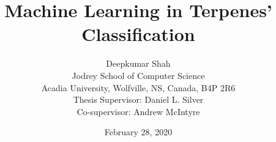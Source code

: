 \documentclass[12pt, a4paper]{article}
\title{Machine Learning in Terpenes' Classification}
\date{February 28, 2020}
\author{Deepkumar Shah \\Jodrey School of Computer Science \\Acadia University, Wolfville, NS, Canada, B4P 2R6 \\[1 cm]{\small Thesis Supervisor: Daniel L. Silver} \\{\small Co-supervisor: Andrew McIntyre}}
\newcommand\summaryname{Abstract}
\newenvironment{Abstract}%
    {\small\begin{center}%
    \bfseries{\summaryname} \end{center}}
\begin{document}
\maketitle

{}

\begin{Abstract}
Traditionally, separation and classification of terpenes from food samples is done with the help of two processes, namely: Gas Chromatography (GC) (separate terpenes from each other) and Mass Spectrometry (MS) (detects the separated terpenes) \cite{de2000} \cite{Jiang2016}. A mass spectrum, generated by mass spectrometry is matched by a chemist from a existing database of mass spectra of various samples. Artificial Neural Networks (ANNs), Support Vector Machines (SVMs) and Deep Learning, in particular, have been widely adopted for many modern supervised learning tasks (e.g., classification and regression problems) and are known for their state-of-the-art generalization performance. The proposed research uses ANNs as part of a tool that can read mass spectra and automatically detect the presence of various terpenes and determine their relative proportions. Early classification results using the SVM algorithm returns an accuracy of 91.43\% for four terpenes.

\end{Abstract}

\newpage

\section{Introduction}
\end{document}

